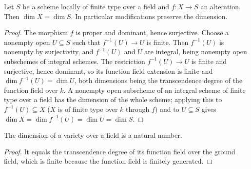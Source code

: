 \endgroup

\begingroup

\begin{lemma}
\label{lem:sm-dj-dim-alteration}
\leanok
Let $S$ be a scheme locally of finite type over a field and $f:X\to S$ an
alteration. Then $\dim X=\dim S$. In particular modifications preserve the
dimension.
\end{lemma}
\begin{proof}
The morphism $f$ is proper and dominant, hence surjective. Choose a nonempty
open $U\subseteq S$ such that $f^{-1}(U)\to U$ is finite. Then $f^{-1}(U)$ is
nonempty by surjectivity, and $f^{-1}(U)$ and $U$ are integral, being nonempty
open subschemes of integral schemes. The restriction $f^{-1}(U)\to U$ is finite
and surjective, hence dominant, so its function field extension is finite and
$\dim f^{-1}(U)=\dim U$, both dimensions being the transcendence degree of the
function field over $k$. A nonempty open subscheme of an integral scheme of
finite type over a field has the dimension of the whole scheme; applying this to
$f^{-1}(U)\subseteq X$ ($X$ is of finite type over $k$ through $f$) and to
$U\subseteq S$ gives $\dim X=\dim f^{-1}(U)=\dim U=\dim S$.
\end{proof}

\endgroup

\begingroup

\begin{lemma}
\label{lem:sm-dj-dim-finite}
\leanok
The dimension of a variety over a field is a natural number.
\end{lemma}
\begin{proof}
It equals the transcendence degree of its function field over the ground
field, which is finite because the function field is finitely generated.
\end{proof}

\endgroup

\begingroup


